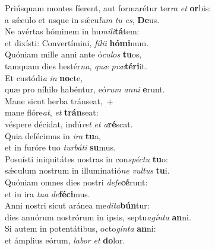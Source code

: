 \evenverse Priúsquam montes fíerent, aut formarétur ter\textit{ra} \textit{et} \textbf{or}bis:~\*\\
\evenverse a sǽculo et usque in sǽcu\textit{lum} \textit{tu} \textit{es}, \textbf{De}us.\\
\oddverse Ne avértas hóminem in hu\textit{mi}\textit{li}\textbf{tá}tem:~\*\\
\oddverse et dixísti: Convertímini, \textit{fí}\textit{li}\textit{i} \textbf{hó}\textbf{mi}num.\\
\evenverse Quóniam mille anni ante ó\textit{cu}\textit{los} \textbf{tu}os,~\*\\
\evenverse tamquam dies hestér\textit{na}, \textit{quæ} \textit{præ}\textbf{té}\textbf{ri}it.\\
\oddverse Et custódi\textit{a} \textit{in} \textbf{no}cte,~\*\\
\oddverse quæ pro níhilo habéntur, eó\textit{rum} \textit{an}\textit{ni} \textbf{e}runt.\\
\evenverse Mane sicut herba tránseat,~+\\
\evenverse  mane flóre\textit{at}, \textit{et} \textbf{trán}seat:~\*\\
\evenverse véspere décidat, indú\textit{ret} \textit{et} \textit{a}\textbf{ré}scat.\\
\oddverse Quia defécimus in \textit{i}\textit{ra} \textbf{tu}a,~\*\\
\oddverse et in furóre tuo \textit{tur}\textit{bá}\textit{ti} \textbf{su}mus.\\
\evenverse Posuísti iniquitátes nostras in con\textit{spé}\textit{ctu} \textbf{tu}o:~\*\\
\evenverse sǽculum nostrum in illuminatió\textit{ne} \textit{vul}\textit{tus} \textbf{tu}i.\\
\oddverse Quóniam omnes dies nostri \textit{de}\textit{fe}\textbf{cé}runt:~\*\\
\oddverse et in ira \textit{tu}\textit{a} \textit{de}\textbf{fé}\textbf{ci}mus.\\
\evenverse Anni nostri sicut aránea me\textit{di}\textit{ta}\textbf{bún}tur:~\*\\
\evenverse dies annórum nostrórum in ipsis, septu\textit{a}\textit{gín}\textit{ta} \textbf{an}ni.\\
\oddverse Si autem in potentátibus, octo\textit{gín}\textit{ta} \textbf{an}ni:~\*\\
\oddverse et ámplius eórum, \textit{la}\textit{bor} \textit{et} \textbf{do}lor.\\
